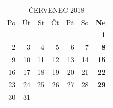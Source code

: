 \documentclass{article}
\begin{document}
\newpage
\begin{table}[t!]
\centering
{}
\end{table}

\selectfont
\def\arraystretch{1.75}
\tabcolsep=10pt
\begin{tabular}{*6{r}>{\bfseries}r}
\multicolumn{7}{c}{ČERVENEC 2018}\\
\rowcolor[gray]{.75} Po & Út & St & Čt & Pá & So & Ne \\
\hline
                        &    &    &    &    &    & 1  \\
                     2  & 3  & 4  & 5  & 6  & 7  & 8  \\
                     9  & 10 & 11 & 12 & 13 & 14 & 15 \\
                     16 & 17 & 18 & 19 & 20 & 21 & 22 \\
                     23 & 24 & 25 & 26 & 27 & 28 & 29 \\
                     30 & 31 &    &    &    &    &    \\
\end{tabular}

\newpage
\begin{table}[t!]
\centering
{}
\end{table}
\end{document}
